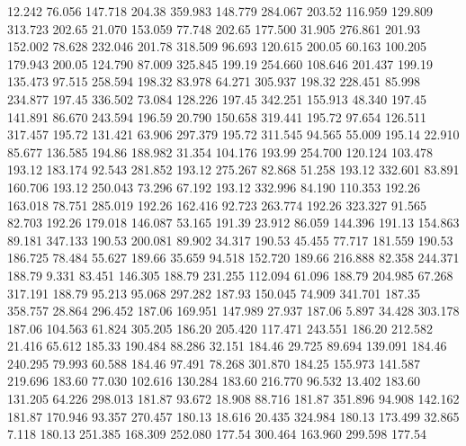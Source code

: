   12.242   76.056  147.718       204.38
 359.983  148.779  284.067       203.52
 116.959  129.809  313.723       202.65
  21.070  153.059   77.748       202.65
 177.500   31.905  276.861       201.93
 152.002   78.628  232.046       201.78
 318.509   96.693  120.615       200.05
  60.163  100.205  179.943       200.05
 124.790   87.009  325.845       199.19
 254.660  108.646  201.437       199.19
 135.473   97.515  258.594       198.32
  83.978   64.271  305.937       198.32
 228.451   85.998  234.877       197.45
 336.502   73.084  128.226       197.45
 342.251  155.913   48.340       197.45
 141.891   86.670  243.594       196.59
  20.790  150.658  319.441       195.72
  97.654  126.511  317.457       195.72
 131.421   63.906  297.379       195.72
 311.545   94.565   55.009       195.14
  22.910   85.677  136.585       194.86
 188.982   31.354  104.176       193.99
 254.700  120.124  103.478       193.12
 183.174   92.543  281.852       193.12
 275.267   82.868   51.258       193.12
 332.601   83.891  160.706       193.12
 250.043   73.296   67.192       193.12
 332.996   84.190  110.353       192.26
 163.018   78.751  285.019       192.26
 162.416   92.723  263.774       192.26
 323.327   91.565   82.703       192.26
 179.018  146.087   53.165       191.39
  23.912   86.059  144.396       191.13
 154.863   89.181  347.133       190.53
 200.081   89.902   34.317       190.53
  45.455   77.717  181.559       190.53
 186.725   78.484   55.627       189.66
  35.659   94.518  152.720       189.66
 216.888   82.358  244.371       188.79
   9.331   83.451  146.305       188.79
 231.255  112.094   61.096       188.79
 204.985   67.268  317.191       188.79
  95.213   95.068  297.282       187.93
 150.045   74.909  341.701       187.35
 358.757   28.864  296.452       187.06
 169.951  147.989   27.937       187.06
   5.897   34.428  303.178       187.06
 104.563   61.824  305.205       186.20
 205.420  117.471  243.551       186.20
 212.582   21.416   65.612       185.33
 190.484   88.286   32.151       184.46
  29.725   89.694  139.091       184.46
 240.295   79.993   60.588       184.46
  97.491   78.268  301.870       184.25
 155.973  141.587  219.696       183.60
  77.030  102.616  130.284       183.60
 216.770   96.532   13.402       183.60
 131.205   64.226  298.013       181.87
  93.672   18.908   88.716       181.87
 351.896   94.908  142.162       181.87
 170.946   93.357  270.457       180.13
  18.616   20.435  324.984       180.13
 173.499   32.865    7.118       180.13
 251.385  168.309  252.080       177.54
 300.464  163.960  299.598       177.54
